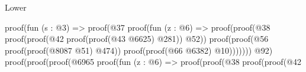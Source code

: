 \begin{lexlean}{Lower}
\begin{coremodule}
                                                                                                  proof(fun (s : @3) =>
                                                                                                    proof(@37
                                                                                                        proof(fun (z : @6) =>
                                                                                                          proof(proof(@38
                                                                                                                proof(proof(@42
                                                                                                                      proof(proof(@43
                                                                                                                            @6625)
                                                                                                                          @281))
                                                                                                                    @52))
                                                                                                              proof(proof(@56
                                                                                                                    proof(proof(@8087
                                                                                                                          @51)
                                                                                                                        @474))
                                                                                                                  proof(proof(@66
                                                                                                                        @6382)
                                                                                                                      @10)))))))
                                                                                                @92)
                                                                                              proof(proof(proof(@6965
                                                                                                      proof(fun (z : @6) =>
                                                                                                        proof(proof(@38
                                                                                                              proof(proof(@42

\end{coremodule}
\end{lexlean}
